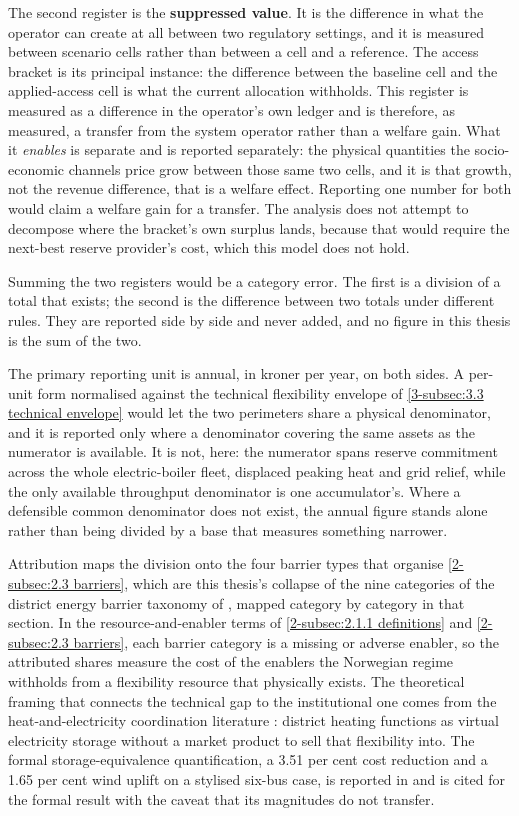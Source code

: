 The second register is the \textbf{suppressed value}. It is the difference in what the operator can create at all between two regulatory settings, and it is measured between scenario cells rather than between a cell and a reference. The access bracket is its principal instance: the difference between the baseline cell and the applied-access cell is what the current allocation withholds. This register is measured as a difference in the operator's own ledger and is therefore, as measured, a transfer from the system operator rather than a welfare gain. What it \emph{enables} is separate and is reported separately: the physical quantities the socio-economic channels price grow between those same two cells, and it is that growth, not the revenue difference, that is a welfare effect. Reporting one number for both would claim a welfare gain for a transfer. The analysis does not attempt to decompose where the bracket's own surplus lands, because that would require the next-best reserve provider's cost, which this model does not hold.

Summing the two registers would be a category error. The first is a division of a total that exists; the second is the difference between two totals under different rules. They are reported side by side and never added, and no figure in this thesis is the sum of the two.

The primary reporting unit is annual, in kroner per year, on both sides. A per-unit form normalised against the technical flexibility envelope of \autoref{3-subsec:3.3 technical envelope} would let the two perimeters share a physical denominator, and it is reported only where a denominator covering the same assets as the numerator is available. It is not, here: the numerator spans reserve commitment across the whole electric-boiler fleet, displaced peaking heat and grid relief, while the only available throughput denominator is one accumulator's. Where a defensible common denominator does not exist, the annual figure stands alone rather than being divided by a base that measures something narrower.

Attribution maps the division onto the four barrier types that organise \autoref{2-subsec:2.3 barriers}, which are this thesis's collapse of the nine categories of the district energy barrier taxonomy of \cite{sneum_barriers_2021}, mapped category by category in that section. In the resource-and-enabler terms of \autoref{2-subsec:2.1.1 definitions} and \autoref{2-subsec:2.3 barriers}, each barrier category is a missing or adverse enabler, so the attributed shares measure the cost of the enablers the Norwegian regime withholds from a flexibility resource that physically exists. The theoretical framing that connects the technical gap to the institutional one comes from the heat-and-electricity coordination literature \cite{mitridati_heat_2020}: district heating functions as virtual electricity storage without a market product to sell that flexibility into. The formal storage-equivalence quantification, a 3.51 per cent cost reduction and a 1.65 per cent wind uplift on a stylised six-bus case, is reported in \cite{mitridati_power_2018} and is cited for the formal result with the caveat that its magnitudes do not transfer.

